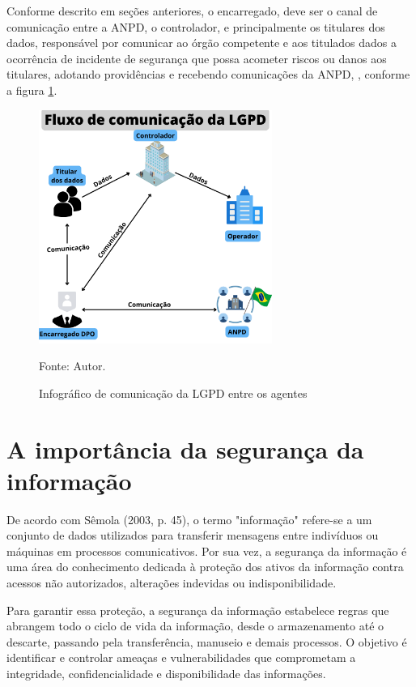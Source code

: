 \documentclass[
	12pt,				%
	openright,			%
	oneside,			%
	a4paper,			%
	english,			%
	french,				%
	spanish,			%
	brazil,				%
	]{abntex2}
\begin{document}
Conforme descrito em seções anteriores, o encarregado, deve ser o canal de comunicação entre a ANPD, o controlador, e principalmente os titulares dos dados, responsável por comunicar ao órgão competente e aos titulados dados a ocorrência de incidente de segurança que possa acometer riscos ou danos aos titulares, adotando providências e recebendo comunicações da ANPD, \cite{LGPD12Mag2020}, conforme a figura \ref{fig: Fluxo }.
\begin{figure}[ht]
    \centering
    \caption{Infográfico de comunicação da LGPD entre os agentes}
    \includegraphics[width=3.0in]{Images/04FluxoLGPD.png}
    
    \label{fig: Fluxo }
    \centering \small Fonte: Autor.
\end{figure}


\section{A importância da segurança da informação }

De acordo com Sêmola (2003, p. 45), o termo "informação" refere-se a um conjunto de dados utilizados para transferir mensagens entre indivíduos ou máquinas em processos comunicativos. Por sua vez, a segurança da informação é uma área do conhecimento dedicada à proteção dos ativos da informação contra acessos não autorizados, alterações indevidas ou indisponibilidade.

Para garantir essa proteção, a segurança da informação estabelece regras que abrangem todo o ciclo de vida da informação, desde o armazenamento até o descarte, passando pela transferência, manuseio e demais processos. O objetivo é identificar e controlar ameaças e vulnerabilidades que comprometam a integridade, confidencialidade e disponibilidade das informações.
\end{document}
